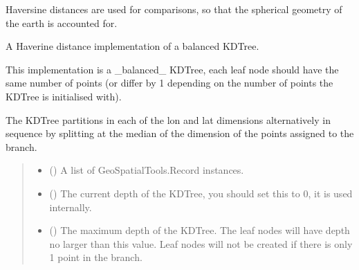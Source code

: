 \documentclass[letterpaper,10pt,english]{sphinxmanual}
\begin{document}
\sphinxAtStartPar
Haversine distances are used for comparisons, so that the spherical geometry
of the earth is accounted for.

\begin{fulllineitems}
\label{\detokenize{kdtree:GeoSpatialTools.kdtree.KDTree}}
\pysigstartsignatures
\pysiglinewithargsret
{}
{\sphinxparamcomma {}\sphinxparamcomma {}}
{}
\pysigstopsignatures
\sphinxAtStartPar
A Haverine distance implementation of a balanced KDTree.

\sphinxAtStartPar
This implementation is a \_balanced\_ KDTree, each leaf node should have the
same number of points (or differ by 1 depending on the number of points
the KDTree is initialised with).

\sphinxAtStartPar
The KDTree partitions in each of the lon and lat dimensions alternatively
in sequence by splitting at the median of the dimension of the points
assigned to the branch.
\begin{quote}\begin{description}
\begin{itemize}
\item {}
\sphinxAtStartPar
{} (\sphinxstyleliteralemphasis{\sphinxupquote{{[}}}{\hyperref[\detokenize{record:GeoSpatialTools.record.Record}]{\sphinxcrossref{\sphinxstyleliteralemphasis{\sphinxupquote{Record}}}}}\sphinxstyleliteralemphasis{\sphinxupquote{{]}}}) \textendash{} A list of GeoSpatialTools.Record instances.

\item {}
\sphinxAtStartPar
{} () \textendash{} The current depth of the KDTree, you should set this to 0, it is used
internally.

\item {}
\sphinxAtStartPar
{} () \textendash{} The maximum depth of the KDTree. The leaf nodes will have depth no
larger than this value. Leaf nodes will not be created if there is
only 1 point in the branch.


\end{itemize}
\end{description}
\end{quote}
\end{fulllineitems}
\end{document}
